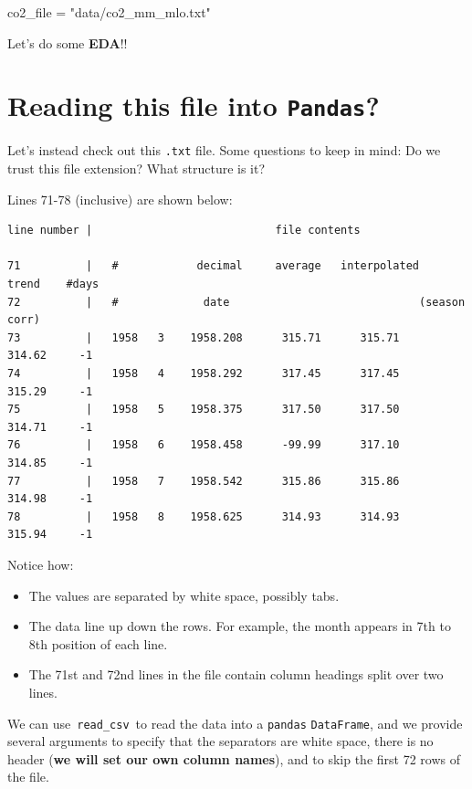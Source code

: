 \documentclass[
  letterpaper,
  DIV=11,
  numbers=noendperiod]{scrreprt}
\newenvironment{Shaded}{\begin{snugshade}}{\end{snugshade}}
\newcommand{\NormalTok}[1]{\textcolor[rgb]{0.00,0.23,0.31}{#1}}
\newcommand{\OperatorTok}[1]{\textcolor[rgb]{0.37,0.37,0.37}{#1}}
\newcommand{\StringTok}[1]{\textcolor[rgb]{0.13,0.47,0.30}{#1}}
\providecommand{\tightlist}{%
  \setlength{\itemsep}{0pt}\setlength{\parskip}{0pt}}\usepackage{longtable,booktabs,array}
\begin{document}
\begin{Shaded}
\begin{Highlighting}[]
\NormalTok{co2\_file }\OperatorTok{=} \StringTok{"data/co2\_mm\_mlo.txt"}
\end{Highlighting}
\end{Shaded}

Let's do some \textbf{EDA}!!

\hypertarget{reading-this-file-into-pandas}{%
\section{\texorpdfstring{Reading this file into
\texttt{Pandas}?}{Reading this file into Pandas?}}\label{reading-this-file-into-pandas}}

Let's instead check out this \texttt{.txt} file. Some questions to keep
in mind: Do we trust this file extension? What structure is it?

Lines 71-78 (inclusive) are shown below:

\begin{verbatim}
line number |                            file contents

71          |   #            decimal     average   interpolated    trend    #days
72          |   #             date                             (season corr)
73          |   1958   3    1958.208      315.71      315.71      314.62     -1
74          |   1958   4    1958.292      317.45      317.45      315.29     -1
75          |   1958   5    1958.375      317.50      317.50      314.71     -1
76          |   1958   6    1958.458      -99.99      317.10      314.85     -1
77          |   1958   7    1958.542      315.86      315.86      314.98     -1
78          |   1958   8    1958.625      314.93      314.93      315.94     -1
\end{verbatim}

Notice how:

\begin{itemize}
\tightlist
\item
  The values are separated by white space, possibly tabs.
\item
  The data line up down the rows. For example, the month appears in 7th
  to 8th position of each line.
\item
  The 71st and 72nd lines in the file contain column headings split over
  two lines.
\end{itemize}

We can use~\texttt{read\_csv}~to read the data into a \texttt{pandas}
\texttt{DataFrame}, and we provide several arguments to specify that the
separators are white space, there is no header (\textbf{we will set our
own column names}), and to skip the first 72 rows of the file.
\end{document}
